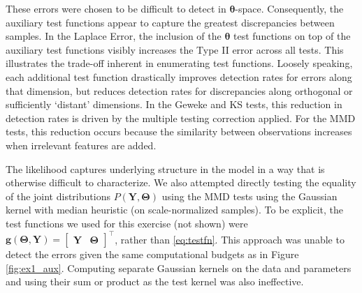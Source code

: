 \documentclass[a4paper,11pt]{article}
\begin{document}
These errors were chosen to be difficult to detect in $\mathbf{\theta}$-space. Consequently, the auxiliary test functions appear to capture the greatest discrepancies between samples. In the Laplace Error, the inclusion of the $\mathbf{\theta}$ test functions on top of the auxiliary test functions visibly increases the Type II error across all tests. This illustrates the trade-off inherent in enumerating test functions. Loosely speaking, each additional test function drastically improves detection rates for errors along that dimension, but reduces detection rates for discrepancies along orthogonal or sufficiently `distant' dimensions. In the Geweke and KS tests, this reduction in detection rates is driven by the multiple testing correction applied. For the MMD tests, this reduction occurs because the similarity between observations increases when irrelevant features are added.

The likelihood captures underlying structure in the model in a way that is otherwise difficult to characterize. We also attempted directly testing the equality of the joint distributions $P(\mathbf{Y}, \mathbf{\Theta})$ using the MMD tests using the Gaussian kernel with median heuristic (on scale-normalized samples). To be explicit, the test functions we used for this exercise (not shown) were $\mathbf{g}(\mathbf{\Theta}, \mathbf{Y}) = \begin{bmatrix}  \mathbf{Y}& \mathbf{\Theta} \end{bmatrix}^{\top}$, rather than \eqref{eq:testfn}. This approach was unable to detect the errors given the same computational budgets as in Figure \ref{fig:ex1_aux}. Computing separate Gaussian kernels on the data and parameters and using their sum or product as the test kernel was also ineffective.
\end{document}
